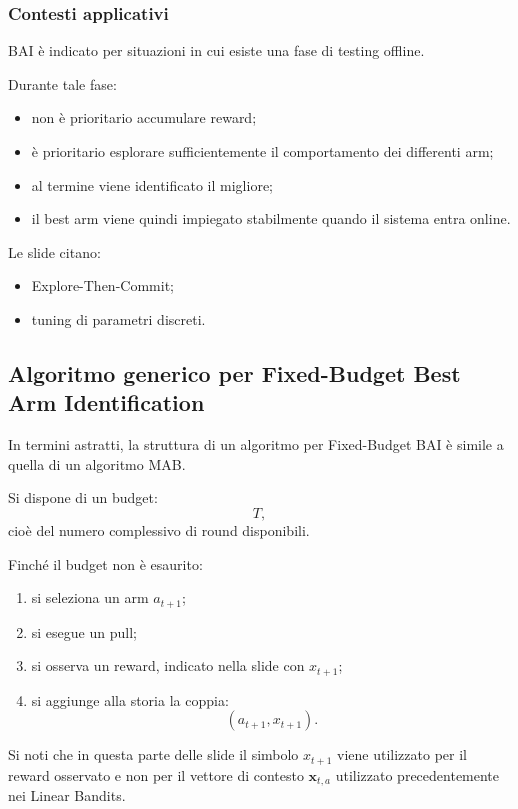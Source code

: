 \subsubsection{Contesti applicativi}

BAI è indicato per situazioni in cui esiste una fase di testing offline.

Durante tale fase:
\begin{itemize}
    \item non è prioritario accumulare reward;
    \item è prioritario esplorare sufficientemente il comportamento dei differenti arm;
    \item al termine viene identificato il migliore;
    \item il best arm viene quindi impiegato stabilmente quando il sistema entra online.
\end{itemize}

Le slide citano:
\begin{itemize}
    \item Explore-Then-Commit;
    \item tuning di parametri discreti.
\end{itemize}

\subsection{Algoritmo generico per Fixed-Budget Best Arm Identification}

In termini astratti, la struttura di un algoritmo per Fixed-Budget BAI è simile a quella di un algoritmo MAB.

Si dispone di un budget:
\[
T,
\]
cioè del numero complessivo di round disponibili.

Finché il budget non è esaurito:
\begin{enumerate}
    \item si seleziona un arm $a_{t+1}$;
    \item si esegue un pull;
    \item si osserva un reward, indicato nella slide con $x_{t+1}$;
    \item si aggiunge alla storia la coppia:
    \[
    (a_{t+1},x_{t+1}).
    \]
\end{enumerate}

Si noti che in questa parte delle slide il simbolo $x_{t+1}$ viene utilizzato per il reward osservato e non per il vettore di contesto $\mathbf{x}_{t,a}$ utilizzato precedentemente nei Linear Bandits.

